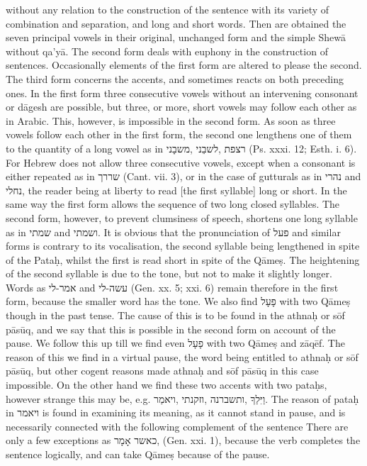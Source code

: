 \documentclass[12pt]{article}
\begin{document}
without any relation to the construction of the sentence with its variety of combination and separation, and long and short words. Then are obtained the seven principal vowels in their original, unchanged form and the simple Shewā without qa’yā. The second form deals with euphony in the construction of sentences. Occasionally elements of the first form are altered to please the second. The third form concerns the accents, and sometimes reacts on both preceding ones. In the first form three consecutive vowels without an intervening consonant or dāgesh are possible, but three, or more, short vowels may follow each other as in Arabic. This, however, is impossible in the second form. As soon as three vowels follow each other in the first form, the second one lengthens one of them to the quantity of a long vowel as in ‏משבָני‎, ‏לשבֵני‎, ‏רצפת‎ (Ps. xxxi. 12; Esth. i. 6). For Hebrew does not allow three consecutive vowels, except when a consonant is either repeated as in ‏שררך‎ (Cant. vii. 3), or in the case of gutturals as in ‏נהרי‎ and ‏נחלי‎, the reader being at liberty to read [the first syllable] long or short. In the same way the first form allows the sequence of two long closed syllables. The second form, however, to prevent clumsiness of speech, shortens one long syllable as in ‏שמתי‎ and ‏ושמתי‎. It is obvious that the pronunciation of ‏פעל‎ and similar forms is contrary to its vocalisation, the second syllable being lengthened in spite of the Pataḥ, whilst the first is read short in spite of the Qāmeṣ. The heightening of the second syllable is due to the tone, but not to make it slightly longer. Words as ‏אמר-לי‎ and ‏עשה-לי‎ (Gen. xx. 5; xxi. 6) remain therefore in the first form, because the smaller word has the tone. We also find ‏פָעָל‎ with two Qāmeṣ though in the past tense. The cause of this is to be found in the athnaḥ or sōf pāsūq, and we say that this is possible in the second form on account of the pause. We follow this up till we find even ‏פָעָל‎ with two Qāmeṣ and zāqēf. The reason of this we find in a virtual pause, the word being entitled to athnaḥ or sōf pāsūq, but other cogent reasons made athnaḥ and sōf pāsūq in this case impossible. On the other hand we find these two accents with two pataḥs, however strange this may be, e.g. ‏ויאמַר‎, ‏וזקנתי‎, ‏ותשברנה‎, ‏וַיִּלַךָ‎. The reason of pataḥ in ‏ויאמר‎ is found in examining its meaning, as it cannot stand in pause, and is necessarily connected with the following complement of the sentence There are only a few exceptions as ‏כאשר אָמָר‎, (Gen. xxi. 1), because the verb completes the sentence logically, and can take Qāmeṣ because of the pause.
\end{document}
